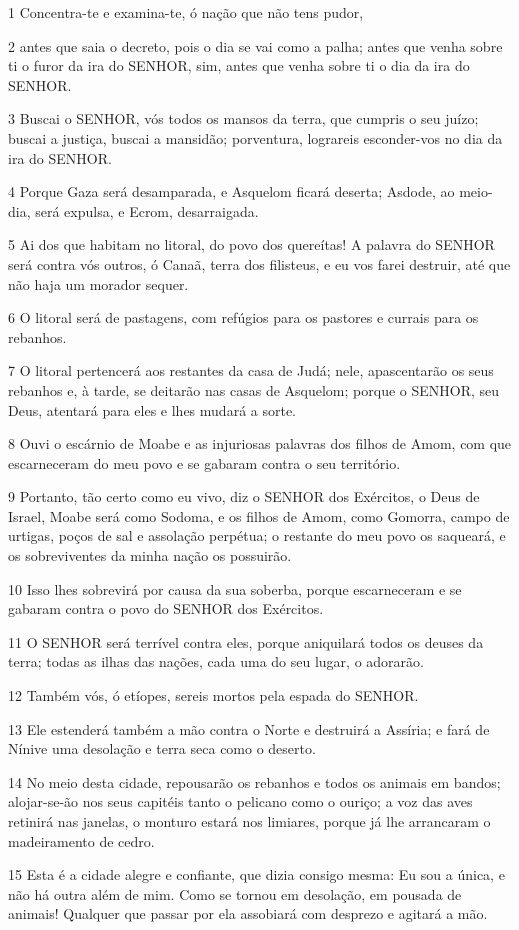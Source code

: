 \par 1 Concentra-te e examina-te, ó nação que não tens pudor,
\par 2 antes que saia o decreto, pois o dia se vai como a palha; antes que venha sobre ti o furor da ira do SENHOR, sim, antes que venha sobre ti o dia da ira do SENHOR.
\par 3 Buscai o SENHOR, vós todos os mansos da terra, que cumpris o seu juízo; buscai a justiça, buscai a mansidão; porventura, lograreis esconder-vos no dia da ira do SENHOR.
\par 4 Porque Gaza será desamparada, e Asquelom ficará deserta; Asdode, ao meio-dia, será expulsa, e Ecrom, desarraigada.
\par 5 Ai dos que habitam no litoral, do povo dos quereítas! A palavra do SENHOR será contra vós outros, ó Canaã, terra dos filisteus, e eu vos farei destruir, até que não haja um morador sequer.
\par 6 O litoral será de pastagens, com refúgios para os pastores e currais para os rebanhos.
\par 7 O litoral pertencerá aos restantes da casa de Judá; nele, apascentarão os seus rebanhos e, à tarde, se deitarão nas casas de Asquelom; porque o SENHOR, seu Deus, atentará para eles e lhes mudará a sorte.
\par 8 Ouvi o escárnio de Moabe e as injuriosas palavras dos filhos de Amom, com que escarneceram do meu povo e se gabaram contra o seu território.
\par 9 Portanto, tão certo como eu vivo, diz o SENHOR dos Exércitos, o Deus de Israel, Moabe será como Sodoma, e os filhos de Amom, como Gomorra, campo de urtigas, poços de sal e assolação perpétua; o restante do meu povo os saqueará, e os sobreviventes da minha nação os possuirão.
\par 10 Isso lhes sobrevirá por causa da sua soberba, porque escarneceram e se gabaram contra o povo do SENHOR dos Exércitos.
\par 11 O SENHOR será terrível contra eles, porque aniquilará todos os deuses da terra; todas as ilhas das nações, cada uma do seu lugar, o adorarão.
\par 12 Também vós, ó etíopes, sereis mortos pela espada do SENHOR.
\par 13 Ele estenderá também a mão contra o Norte e destruirá a Assíria; e fará de Nínive uma desolação e terra seca como o deserto.
\par 14 No meio desta cidade, repousarão os rebanhos e todos os animais em bandos; alojar-se-ão nos seus capitéis tanto o pelicano como o ouriço; a voz das aves retinirá nas janelas, o monturo estará nos limiares, porque já lhe arrancaram o madeiramento de cedro.
\par 15 Esta é a cidade alegre e confiante, que dizia consigo mesma: Eu sou a única, e não há outra além de mim. Como se tornou em desolação, em pousada de animais! Qualquer que passar por ela assobiará com desprezo e agitará a mão.

